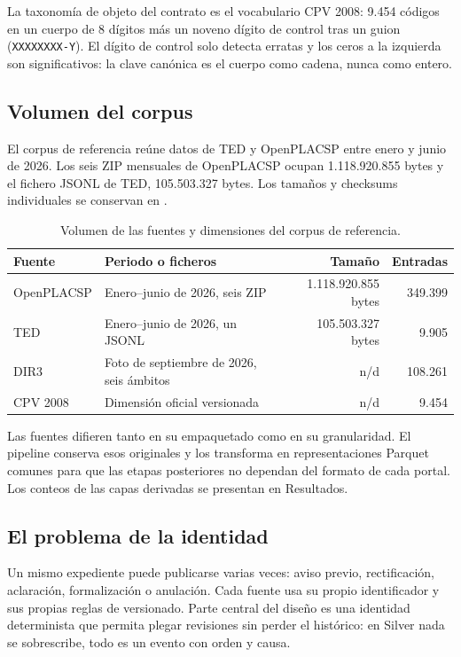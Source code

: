 \documentclass[11pt,a4paper]{article}
\newcommand{\cabecera}[1]{{\bfseries #1}}
\begin{document}
La taxonomía de objeto del contrato es el vocabulario CPV 2008: 9.454 códigos
en un cuerpo de 8 dígitos más un noveno dígito de control tras un guion
(\texttt{XXXXXXXX-Y}). El dígito de control solo detecta erratas y los ceros a
la izquierda son significativos: la clave canónica es el cuerpo como cadena,
nunca como entero.

\subsection{Volumen del corpus}

El corpus de referencia reúne datos de TED y OpenPLACSP entre enero y junio de
2026. Los seis ZIP mensuales de OpenPLACSP ocupan 1.118.920.855 bytes y el
fichero JSONL de TED, 105.503.327 bytes. Los tamaños y checksums individuales
se conservan en .

\begin{table}[ht]
\centering
\small
\begin{tabularx}{\textwidth}{@{}l X r r@{}}
\toprule
\cabecera{Fuente} & \cabecera{Periodo o ficheros} & \cabecera{Tamaño} & \cabecera{Entradas}\\
\midrule
OpenPLACSP & Enero--junio de 2026, seis ZIP & 1.118.920.855 bytes & 349.399\\
TED & Enero--junio de 2026, un JSONL & 105.503.327 bytes & 9.905\\
DIR3 & Foto de septiembre de 2026, seis ámbitos & n/d & 108.261\\
CPV 2008 & Dimensión oficial versionada & n/d & 9.454\\
\bottomrule
\end{tabularx}
\caption{Volumen de las fuentes y dimensiones del corpus de referencia.}
\end{table}

Las fuentes difieren tanto en su empaquetado como en su granularidad. El
pipeline conserva esos originales y los transforma en representaciones
Parquet comunes para que las etapas posteriores no dependan del formato de
cada portal. Los conteos de las capas derivadas se presentan en Resultados.

\subsection{El problema de la identidad}

Un mismo expediente puede publicarse varias veces: aviso previo, rectificación,
aclaración, formalización o anulación. Cada fuente usa su propio identificador
y sus propias reglas de versionado. Parte central del diseño es una identidad
determinista que permita plegar revisiones sin perder el histórico: en Silver
nada se sobrescribe, todo es un evento con orden y causa.
\end{document}
